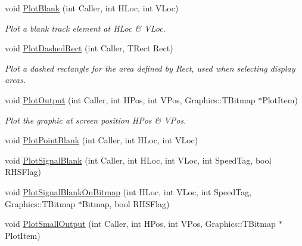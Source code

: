 \begin{DoxyCompactItemize}
\item 
\mbox{\label{class_t_display_ad601661fd4cd79a47b4c80ae77f901a9}} 
void \mbox{\hyperlink{class_t_display_ad601661fd4cd79a47b4c80ae77f901a9}{Plot\+Blank}} (int Caller, int H\+Loc, int V\+Loc)
\begin{DoxyCompactList}\small\item\em Plot a blank track element at H\+Loc \& V\+Loc. \end{DoxyCompactList}\item 
\mbox{\label{class_t_display_a09a60665a7a8c7b5d5c705a08086feec}} 
void \mbox{\hyperlink{class_t_display_a09a60665a7a8c7b5d5c705a08086feec}{Plot\+Dashed\+Rect}} (int Caller, T\+Rect Rect)
\begin{DoxyCompactList}\small\item\em Plot a dashed rectangle for the area defined by Rect, used when selecting display areas. \end{DoxyCompactList}\item 
\mbox{\label{class_t_display_a9ab49e52c7eb92b32ae2c34547183439}} 
void \mbox{\hyperlink{class_t_display_a9ab49e52c7eb92b32ae2c34547183439}{Plot\+Output}} (int Caller, int H\+Pos, int V\+Pos, Graphics\+::\+T\+Bitmap $\ast$Plot\+Item)
\begin{DoxyCompactList}\small\item\em Plot the graphic at screen position H\+Pos \& V\+Pos. \end{DoxyCompactList}\item 
void \mbox{\hyperlink{class_t_display_aab35e517eba56f1c95f500958ce431ae}{Plot\+Point\+Blank}} (int Caller, int H\+Loc, int V\+Loc)
\item 
void \mbox{\hyperlink{class_t_display_a6e970089a9419e6bdd12576b6e860c95}{Plot\+Signal\+Blank}} (int Caller, int H\+Loc, int V\+Loc, int Speed\+Tag, bool R\+H\+S\+Flag)
\item 
void \mbox{\hyperlink{class_t_display_abb140097c975da97aa53bc3946f3ea31}{Plot\+Signal\+Blank\+On\+Bitmap}} (int H\+Loc, int V\+Loc, int Speed\+Tag, Graphics\+::\+T\+Bitmap $\ast$Bitmap, bool R\+H\+S\+Flag)
\item 
\mbox{\label{class_t_display_a95aaa80515f0abb7715920b326b318dd}} 
void \mbox{\hyperlink{class_t_display_a95aaa80515f0abb7715920b326b318dd}{Plot\+Small\+Output}} (int Caller, int H\+Pos, int V\+Pos, Graphics\+::\+T\+Bitmap $\ast$Plot\+Item)

\end{DoxyCompactItemize}
